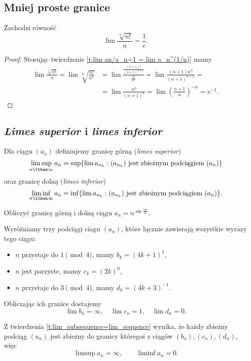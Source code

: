\documentclass[11pt]{scrartcl}
\begin{document}
    \subsection{Mniej proste granice}
    \begin{theorem}
        Zachodzi równość
        \[ \lim\frac{\sqrt[n]{n!}}{n} = \frac{1}{e}. \]
    \end{theorem}
    \begin{proof}
        Stosując twierdzenie \ref{t:lim an/a_n+1 = lim a_n^(1/n)} mamy
        \[\begin{aligned} \lim\frac{\sqrt[n]{n!}}{n} = \lim\sqrt[n]{\frac{n!}{n^n}} &= \lim\frac{\frac{(n+1)!}{(n+1)^{n+1}}}{\frac{n!}{n^n}} = \lim\frac{(n+1)n^n}{(n+1)^{n+1}} = \\
            &= \lim\frac{n^n}{(n+1)^n} = \lim\left(\frac{n+1}{n}\right)^{-n} = e^{-1}. \end{aligned}\]
    \end{proof}

    \subsection{\textit{Limes superior} i \textit{limes inferior}}
    \begin{definition}
        Dla ciągu $(a_n)$ definiujemy granicę górną (\textit{limes superior})
        \[ \limsup_{n \lthen \infty} a_n = \sup\{\lim a_{n_k} : (a_{n_k}) \text{ jest zbieżnym podciągiem } (a_n)\} \]
        oraz granicę dolną (\textit{limes inferior})
        \[ \liminf_{n \lthen \infty} a_n = \inf\{\lim a_{n_k} : (a_{n_k}) \text{ jest zbieżnym podciągiem } (a_n)\}. \]
    \end{definition}

    \begin{example}
        Obliczyć granicę górną i dolną ciągu $a_n = n^{\sin\frac{n\pi}{2}}$.
    \end{example}
    \begin{solution}
        Wyróżniamy trzy podciągi ciagu $(a_n)$, które łącznie zawierają wszystkie wyrazy tego ciągu:
        \begin{itemize}
            \item $n$ przystaje do $1 \pmod{4}$, mamy $b_k = (4k + 1)^1$,
            \item $n$ jest parzyste, mamy $c_k = (2k)^0$,
            \item $n$ przystaje do $3 \pmod{4}$, mamy $d_k = (4k + 3)^{-1}$.
        \end{itemize}

        Obliczając ich granice dostajemy
        \[ \lim b_n = \infty, \quad \lim c_n = 1, \quad \lim d_n = 0. \]

        Z twierdzenia \ref{t:lim_subsequence=lim_sequence} wynika, że każdy zbieżny podciąg $(a_n)$ jest zbieżny do granicy któregoś z ciągów $(b_n), (c_n), (d_n)$, więc
        \[ \limsup a_n = \infty, \qquad \liminf a_n = 0. \]
    \end{solution}
\end{document}
